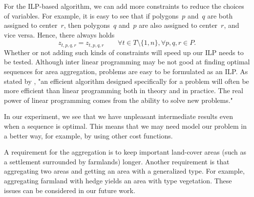 For the ILP-based algorithm, we can add more constraints to
reduce the choices of variables.
For example, it is easy to see that 
if polygons~$p$ and~$q$ are both assigned to center~$r$,
then polygons~$q$ and~$p$ are also assigned to center~$r$,
and vice versa.
Hence, there always holds
\begin{equation}
\label{eq:CstrZX}
z_{t,p,q,r}= z_{t,p,q,r} \qquad
\forall t \in {T} \setminus \{1,n\}, 
\forall p, q, r \in P. \nonumber
\end{equation}
Whether or not adding such kinds of constraints 
will speed up our ILP
needs to be tested.
Although inter linear programming may be not good at 
finding optimal sequences for area aggregation, 
problems are easy to be formulated as an ILP.
As stated by \citet[p.~861]{Cormen2009}, 
"an efficient algorithm designed specifically for a problem 
will often be more efficient than 
linear programming both in theory and in practice. 
The real power of linear programming comes from 
the ability to solve new problems."

In our experiment, we see that 
we have unpleasant intermediate results
even when a sequence is optimal.
This means that we may need model our problem in a better way,
for example, by using other cost functions.

A requirement for the aggregation is to keep 
important land-cover areas (such as a settlement surrounded by 
farmlands) longer. 
%
Another requirement is that 
aggregating two areas and 
getting an area with a generalized type. 
For example, aggregating 
farmland with hedge yields an area with type vegetation.
%
These issues can be considered in our future work.
%









